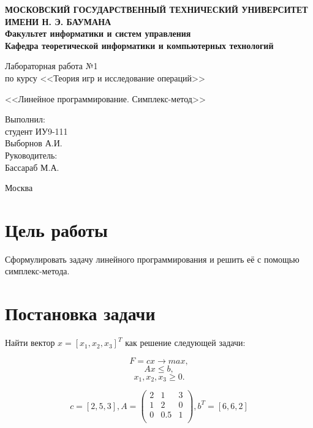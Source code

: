 \documentclass[12pt,a4paper,oneside]{extarticle}
\begin{document}
\pgfplotsset{compat=1.8}

\thispagestyle{empty}
\newpage
{
\centering


\textbf{
МОСКОВСКИЙ ГОСУДАРСТВЕННЫЙ ТЕХНИЧЕСКИЙ УНИВЕРСИТЕТ ИМЕНИ Н. Э. БАУМАНА \\
Факультет информатики и систем управления \\
Кафедра теоретической информатики и компьютерных технологий}
\bigskip
\bigskip
\bigskip
\bigskip
\bigskip
\bigskip
\bigskip

\vfill


Лабораторная работа №1 \\
по курсу <<Теория игр и исследование операций>>

\bigskip

{\large <<Линейное программирование. Симплекс-метод>>}
\bigskip

\vfill



\hfill\parbox{4cm} {
Выполнил:\\
студент ИУ9-111 \hfill \\
Выборнов А.И.\hfill \medskip\\
Руководитель:\\
Бассараб М.А.\hfill
}


\vspace{\fill}

Москва \number\year
\clearpage
}



\clearpage

\section{Цель работы}
    Сформулировать задачу линейного программирования и решить её с помощью симплекс-метода.

\section{Постановка задачи}
    Найти вектор $x = [x_1, x_2, x_3]^T$ как решение следующей задачи:

    $$F = cx \rightarrow max,$$    $$Ax \leq b,$$    $$x_1, x_2, x_3 \geq 0.$$

    $$c = [2, 5, 3], 
    A = \begin{pmatrix}
        2 & 1 & 3\\
        1 & 2 & 0\\
        0 & 0.5 & 1\\
    \end{pmatrix}, 
    b^T = [6, 6, 2]$$
\end{document}
